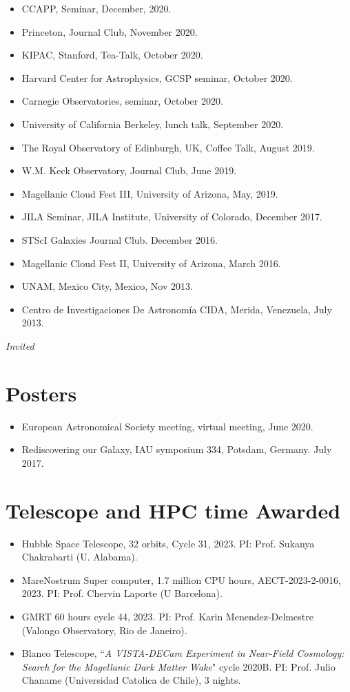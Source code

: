 \documentclass[14pt]{article}
\begin{document}
\begin{itemize}
\item CCAPP, Seminar, December, 2020. \dag
\item Princeton, Journal Club, November 2020. \dag
\item KIPAC, Stanford, Tea-Talk, October 2020.
\item Harvard Center for Astrophysics, GCSP seminar, October 2020.
\item Carnegie Observatories, seminar, October 2020. \dag
\item University of California Berkeley, lunch talk, September 2020. 
\item The Royal Observatory of Edinburgh, UK, Coffee Talk, August 2019. \dag
\item W.M. Keck Observatory, Journal Club, June 2019.
\item Magellanic Cloud Fest III, University of Arizona, May, 2019.
\item JILA Seminar, JILA Institute, University of Colorado, December 2017.
\item STScI Galaxies Journal Club. December 2016.
\item Magellanic Cloud Fest II, University of Arizona, March 2016.
\item UNAM, Mexico City, Mexico, Nov 2013. 
\item Centro de Investigaciones De Astronom\'ia CIDA, Merida, Venezuela, July 2013.
\end{itemize}
\indent \dag \textit{Invited}

\section*{Posters}
\begin{itemize}
\setlength\itemsep{0.0em}
\renewcommand\labelitemi{$\cdot$}
  \item European Astronomical Society meeting, virtual meeting, June 2020.
  \item Rediscovering our Galaxy, IAU symposium 334, Potsdam, Germany. July 2017.
\end{itemize}

\section*{Telescope and HPC time Awarded}
\begin{itemize}
  \setlength\itemsep{0.0em}
  \renewcommand\labelitemi{$\cdot$}
\item Hubble Space Telescope, 32 orbits, Cycle 31, 2023. PI: Prof. Sukanya Chakrabarti (U. Alabama). 
\item MareNostrum Super computer, 1.7 million CPU hours, AECT-2023-2-0016, 2023.
  PI: Prof. Chervin Laporte (U Barcelona). 
\item GMRT 60 hours cycle 44, 2023. PI: Prof. Karin Menendez-Delmestre (Valongo Observatory, Rio de Janeiro).
\item Blanco Telescope, ``\textit{A VISTA-DECam Experiment in Near-Field
  Cosmology: Search for the Magellanic Dark Matter Wake}" cycle 2020B. PI: Prof. Julio
  Chaname (Universidad Catolica de Chile), 3 nights.
\end{itemize}
\end{document}
